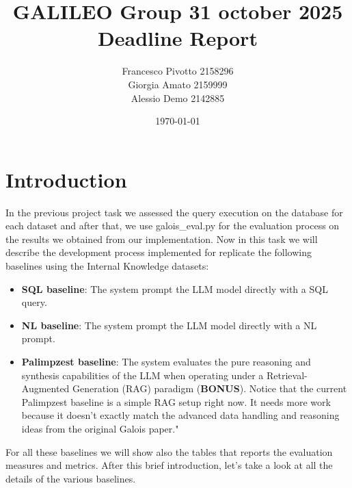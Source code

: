 \documentclass[12pt,a4paper]{article}
\title{GALILEO Group 31 october 2025 Deadline Report}
\author{Francesco Pivotto 2158296\\ Giorgia Amato 2159999\\ Alessio Demo 2142885 }
\date{\today}
\begin{document}
\maketitle

\tableofcontents
\newpage

\section{Introduction }
In the previous project task we assessed the query execution on the database for each dataset and after that, we use galois\_eval.py for the evaluation process on the results we obtained from our implementation.
Now in this task we will describe the development process implemented for replicate the following baselines using the Internal Knowledge datasets:
\begin{itemize}
    \item \textbf{SQL baseline}: The system prompt the LLM model directly with a SQL query.
    \item \textbf{NL baseline}: The system prompt the LLM model directly with a NL prompt.
    \item \textbf{Palimpzest baseline}: The system evaluates the pure reasoning and synthesis capabilities of the LLM when operating under a Retrieval-Augmented Generation (RAG) paradigm (\textbf{BONUS}).
    Notice that the current Palimpzest baseline is a simple RAG setup right now. It needs more work because it doesn't exactly match the advanced data handling and reasoning ideas from the original Galois paper."    
\end{itemize}

For all these baselines we will show also the tables that reports the evaluation measures and metrics.
After this brief introduction, let's take a look at all the details of the various baselines.
\end{document}
